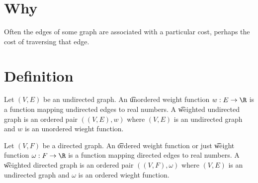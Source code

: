 
\section*{Why}

Often the edges of some graph are associated with a particular cost, perhaps the cost of traversing that edge.

\section*{Definition}

Let $(V, E)$ be an undirected graph.
An \t{unordered weight function} $w: E \to \R $ is a function mapping undirected edges to real numbers.
A \t{weighted undirected graph} is an ordered pair $((V, E),w)$ where $(V, E)$ is an undirected graph and $w$ is an unordered wieght function.

Let $(V, F)$ be a directed graph.
An \t{ordered weight function} or just \t{weight function} $\omega : F \to \R $ is a function mapping directed edges to real numbers.
A \t{weighted directed graph} is an ordered pair $((V, F),\omega )$ where $(V, E)$ is an undirected graph and $\omega $ is an ordered wieght function.

\blankpage